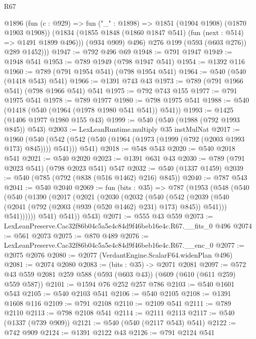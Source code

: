 \begin{lexlean}{R67}
\begin{coremodule}
          @1896
            (fun (c : @929) => fun ("_" : @1898) => @1851 (@1904 @1908) (@1870 @1903 @1908))
            (@1834 (@1855 @1848 (@1860 @1847 @541) (fun (next : @514) => @1491 @1899 @496)))
            (@934 @909)
            @496)
          @276
          @199
          (@593 (@603 @276))
          @289
          @1452)))
@1947 := @792 @496 @69
@1948 := @791 @1947
@1949 := @1948 @541
@1953 := @789 @1949 (@798 @1947 @541)
@1954 := @1392 @116
@1960 := @789 (@791 @1954 @541) (@798 @1954 @541)
@1964 := @540 (@540 (@1418 @543) @541)
@1966 := @1391 @743 @43
@1973 := @789 (@791 @1966 @541) (@798 @1966 @541) @541
@1975 := @792 @743 @155
@1977 := @791 @1975 @541
@1978 := @789 @1977
@1980 := @798 @1975 @541
@1988 := @540 (@1418 (@540 (@1964 (@1978 @1980 @541 @541)) @541))
@1993 := @1425 (@1406 @1977 @1980 @155 @43)
@1999 := @540 (@540 (@1988 (@792 @1993 @845)) @543)
@2003 := LexLeanRuntime.multiply @35 instMulNat
@2017 := @1960
    (@540 (@542 (@542 (@540 (@1964 (@1973 (@1999 (@792 (@2003 @1993 @173) @845)))) @541))) @541)
@2018 := @548 @543
@2020 := @540 @2018 @541
@2021 := @540 @2020
@2023 := @1391 @631 @43
@2030 := @789 (@791 @2023 @541) (@798 @2023 @541) @547
@2032 := @540 (@1337 @1459)
@2039 := @540 (@785 (@792 (@838 (@516 @1462) @216) @845))
@2040 := @787 @543
@2041 := @540 @2040
@2069 := fun (bits : @35) =>
  @787
    (@1953
      (@548
        (@540
          (@540
            (@1390
              (@2017
                (@2021
                  (@2030
                    (@2032
                      (@540
                        (@542
                          (@2039
                            (@540 (@2041 (@792 (@2003 (@939 (@520 @1462) @231) @173) @845)) @541)))
                        @541))))))
            @541)
          @541))
      @543)
@2071 := @555 @43 @559
@2073 := LexLeanPreserve.Cac32f86b04c5a5e4c84d9f46beb16e4c.R67.__fits_0 @496
@2074 := @561 @2073
@2075 := @870 @489
@2076 := LexLeanPreserve.Cac32f86b04c5a5e4c84d9f46beb16e4c.R67.__enc_0
@2077 := @2075 @2076
@2080 := @2077 (VerdantEngine.ScalarF64.widenPlan @496)
@2081 := @2074 @2080
@2083 := (bits : @35) -> @2071 @2081
@2097 := @572 @43 @559 @2081 @259 @588 (@593 (@603 @43)) (@609 (@610 (@611 @259) @559 @587))
@2101 := @1594 @76 @252 @257 @786
@2103 := @540 @1601 @543
@2105 := @540 @2103 @541
@2106 := @540 @2105
@2108 := @1391 @1608 @116
@2109 := @791 @2108
@2110 := @2109 @541
@2111 := @789 @2110
@2113 := @798 @2108 @541
@2114 := @2111 @2113
@2117 := @540 (@1337 (@739 @909))
@2121 := @540 (@540 (@2117 @543) @541)
@2122 := @742 @909
@2124 := @1391 @2122 @43
@2126 := @791 @2124 @541

\end{coremodule}
\end{lexlean}
